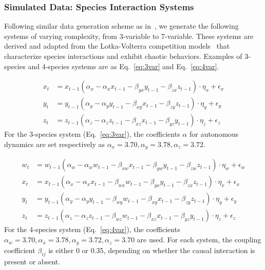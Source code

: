 \subsubsection{Simulated Data: Species Interaction Systems}
\label{sec:genData}

Following similar data generation scheme as in~\cite{leng2020partial}, we generate the following systems of varying complexity, from 3-variable to 7-variable. These systems are derived and adapted from the Lotka-Volterra competition models~\citep{volterra1931theorie, lotka1925elements, roques2011probing} that characterize species interactions and exhibit chaotic behaviors. Examples of 3-species and 4-species systems are as Eq.~\ref{eq:3var} and Eq.~\ref{eq:4var}.

\begin{equation}
\label{eq:3var}
\begin{aligned}
x_t & =x_{t-1}\left(\alpha_x-\alpha_x x_{t-1}-\beta_{yx} y_{t-1}-\beta_{zx} z_{t-1}\right)\cdot\eta_{x}+\epsilon_{x} \\
y_t & =y_{t-1}\left(\alpha_y-\alpha_y y_{t-1}-\beta_{xy} x_{t-1}-\beta_{zy} z_{t-1}\right)\cdot\eta_{y}+\epsilon_{y} \\
z_t & =z_{t-1}\left(\alpha_z-\alpha_z z_{t-1}-\beta_{xz} x_{t-1}-\beta_{yz} y_{t-1}\right)\cdot\eta_{z}+\epsilon_{z}
\end{aligned}
\end{equation}
For the 3-species system (Eq.~\ref{eq:3var}), the coefficients $\alpha$ for autonomous dynamics are set respectively as $\alpha_x=3.70, \alpha_y=3.78, \alpha_z=3.72$.

\begin{equation}
\label{eq:4var}
\begin{aligned}
w_t & =w_{t-1}\left(\alpha_w-\alpha_w w_{t-1}-\beta_{xw} x_{t-1}-\beta_{yw} y_{t-1}-\beta_{zw} z_{t-1}\right)\cdot\eta_{w}+\epsilon_{w} \\
x_t & =x_{t-1}\left(\alpha_x-\alpha_x x_{t-1}-\beta_{wx} w_{t-1}-\beta_{yx} y_{t-1}-\beta_{zx} z_{t-1}\right)\cdot\eta_{x}+\epsilon_{x} \\
y_t & =y_{t-1}\left(\alpha_y-\alpha_y y_{t-1}-\beta_{wy} w_{t-1}-\beta_{xy} x_{t-1}-\beta_{zy} z_{t-1}\right)\cdot\eta_{y}+\epsilon_{y} \\
z_t & =z_{t-1}\left(\alpha_z-\alpha_z z_{t-1}-\beta_{wz} w_{t-1}-\beta_{xz} x_{t-1}-\beta_{yz} y_{t-1}\right)\cdot\eta_{z}+\epsilon_{z}
\end{aligned}
\end{equation}
For the 4-species system (Eq.~\ref{eq:4var}), the coefficients $\alpha_w=3.70, \alpha_x=3.78, \alpha_y=3.72, \alpha_z=3.70$ are used. For each system, the coupling coefficient $\beta_{ij}$ is either 0 or 0.35, depending on whether the causal interaction is present or absent. 

